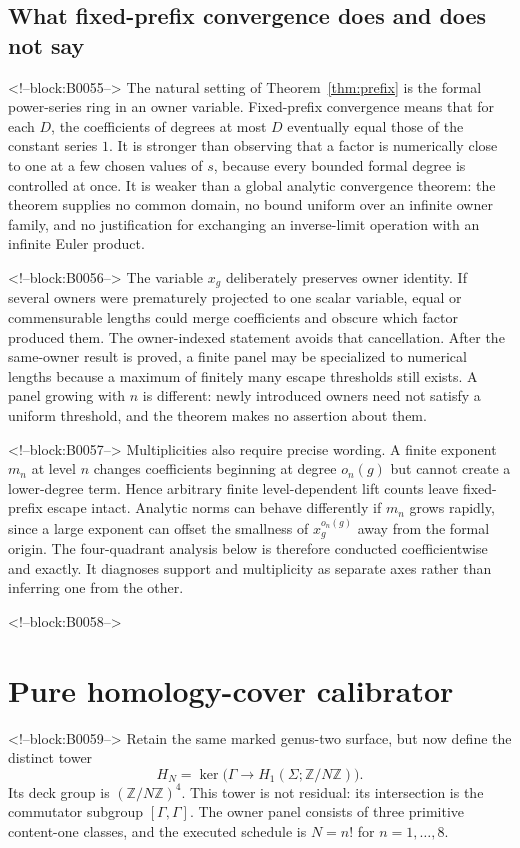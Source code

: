 \documentclass[11pt]{article}
\theoremstyle{definition}
\theoremstyle{remark}
\newcommand{\ZZ}{\mathbb Z}
\begin{document}
\subsection{What fixed-prefix convergence does and does not say}

<!--block:B0055-->
The natural setting of Theorem~\ref{thm:prefix} is the formal power-series ring in an owner variable. Fixed-prefix convergence means that for each $D$, the coefficients of degrees at most $D$ eventually equal those of the constant series $1$. It is stronger than observing that a factor is numerically close to one at a few chosen values of $s$, because every bounded formal degree is controlled at once. It is weaker than a global analytic convergence theorem: the theorem supplies no common domain, no bound uniform over an infinite owner family, and no justification for exchanging an inverse-limit operation with an infinite Euler product.

<!--block:B0056-->
The variable $x_g$ deliberately preserves owner identity. If several owners were prematurely projected to one scalar variable, equal or commensurable lengths could merge coefficients and obscure which factor produced them. The owner-indexed statement avoids that cancellation. After the same-owner result is proved, a finite panel may be specialized to numerical lengths because a maximum of finitely many escape thresholds still exists. A panel growing with $n$ is different: newly introduced owners need not satisfy a uniform threshold, and the theorem makes no assertion about them.

<!--block:B0057-->
Multiplicities also require precise wording. A finite exponent $m_n$ at level $n$ changes coefficients beginning at degree $o_n(g)$ but cannot create a lower-degree term. Hence arbitrary finite level-dependent lift counts leave fixed-prefix escape intact. Analytic norms can behave differently if $m_n$ grows rapidly, since a large exponent can offset the smallness of $x_g^{o_n(g)}$ away from the formal origin. The four-quadrant analysis below is therefore conducted coefficientwise and exactly. It diagnoses support and multiplicity as separate axes rather than inferring one from the other.

<!--block:B0058-->
\section{Pure homology-cover calibrator}

<!--block:B0059-->
Retain the same marked genus-two surface, but now define the distinct tower
\[
H_N=\ker\bigl(\Gamma\to H_1(\Sigma;\ZZ/N\ZZ)\bigr).
\]
Its deck group is $(\ZZ/N\ZZ)^4$. This tower is not residual: its intersection is the commutator subgroup $[\Gamma,\Gamma]$. The owner panel consists of three primitive content-one classes, and the executed schedule is $N=n!$ for $n=1,\ldots,8$.
\end{document}
